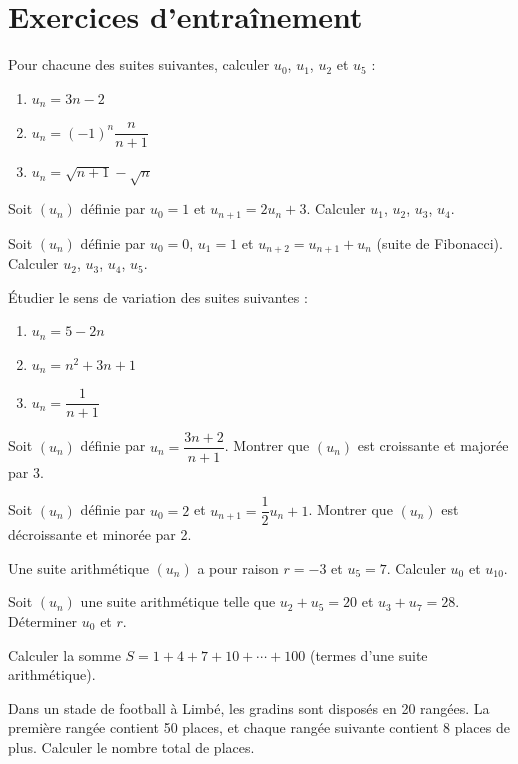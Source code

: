 \section{Exercices d'entraînement}


\exo{}
Pour chacune des suites suivantes, calculer $u_0$, $u_1$, $u_2$ et $u_5$ :
\begin{enumerate}[label=\alph*)]
\item $u_n = 3n - 2$
\item $u_n = (-1)^n \dfrac{n}{n+1}$
\item $u_n = \sqrt{n+1} - \sqrt{n}$
\end{enumerate}

\exo{}
Soit $(u_n)$ définie par $u_0 = 1$ et $u_{n+1} = 2u_n + 3$. Calculer $u_1$, $u_2$, $u_3$, $u_4$.

\exo{}
Soit $(u_n)$ définie par $u_0 = 0$, $u_1 = 1$ et $u_{n+2} = u_{n+1} + u_n$ (suite de Fibonacci). Calculer $u_2$, $u_3$, $u_4$, $u_5$.


\exo{}
Étudier le sens de variation des suites suivantes :
\begin{enumerate}[label=\alph*)]
\item $u_n = 5 - 2n$
\item $u_n = n^2 + 3n + 1$
\item $u_n = \dfrac{1}{n+1}$
\end{enumerate}

\exo{}
Soit $(u_n)$ définie par $u_n = \dfrac{3n+2}{n+1}$. Montrer que $(u_n)$ est croissante et majorée par 3.

\exo{}
Soit $(u_n)$ définie par $u_0 = 2$ et $u_{n+1} = \dfrac{1}{2}u_n + 1$. Montrer que $(u_n)$ est décroissante et minorée par 2.


\exo{}
Une suite arithmétique $(u_n)$ a pour raison $r = -3$ et $u_5 = 7$. Calculer $u_0$ et $u_{10}$.

\exo{}
Soit $(u_n)$ une suite arithmétique telle que $u_2 + u_5 = 20$ et $u_3 + u_7 = 28$. Déterminer $u_0$ et $r$.

\exo{}
Calculer la somme $S = 1 + 4 + 7 + 10 + \cdots + 100$ (termes d'une suite arithmétique).

\exo{}
Dans un stade de football à Limbé, les gradins sont disposés en 20 rangées. La première rangée contient 50 places, et chaque rangée suivante contient 8 places de plus. Calculer le nombre total de places.

